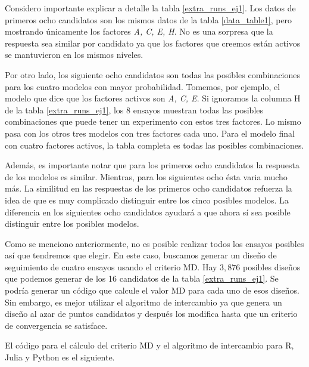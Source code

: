 Considero importante explicar a detalle la tabla \ref{extra_runs_ej1}. Los datos de primeros ocho candidatos son los mismos datos de la tabla \ref{data_table1}, pero mostrando únicamente los factores \textit{A, C, E,  H}. No es una sorpresa que la respuesta  sea similar por candidato ya que los factores que creemos están activos se mantuvieron en los mismos niveles.

Por otro lado, los siguiente ocho candidatos son todas las posibles combinaciones para los cuatro modelos con mayor probabilidad. Tomemos, por ejemplo, el modelo que dice que los factores activos son \textit{A, C, E}. Si ignoramos la columna H de la tabla \ref{extra_runs_ej1}, los 8 ensayos muestran todas las posibles combinaciones que puede tener un experimento con estos tres factores. Lo mismo pasa con los otros tres modelos con tres factores cada uno. Para el modelo final con cuatro factores activos, la tabla completa es todas las posibles combinaciones. 

Además, es importante notar que para los primeros ocho candidatos la respuesta de los modelos es similar. Mientras, para los siguientes ocho ésta varia mucho más. La similitud en las respuestas de los primeros ocho candidatos refuerza la idea de que es muy complicado distinguir entre los cinco posibles modelos. La diferencia en los siguientes ocho candidatos ayudará a que ahora sí sea posible distinguir entre los posibles modelos. 

Como se menciono anteriormente, no es posible realizar todos los ensayos posibles así que tendremos que elegir. En este caso, buscamos generar un diseño de seguimiento de cuatro ensayos usando el criterio MD. Hay $3,876$ posibles diseños que podemos generar de los 16 candidatos de la tabla \ref{extra_runs_ej1}. Se podría generar un código que calcule el valor MD para cada uno de esos diseños. Sin embargo, es mejor utilizar el algoritmo de intercambio ya que genera un diseño al azar de puntos candidatos y después los modifica hasta que un criterio de convergencia se satisface. 

El código para el cálculo del criterio MD y el algoritmo de intercambio para R, Julia y Python es el siguiente. 



